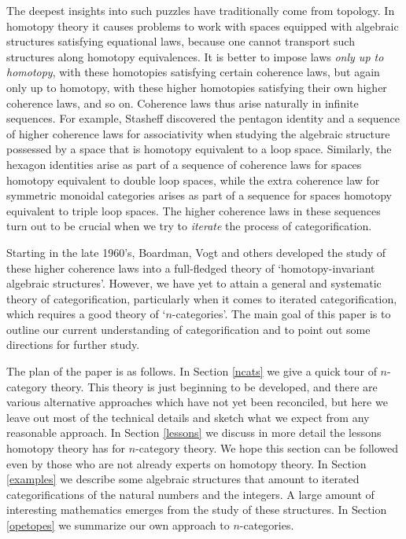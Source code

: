 The deepest insights into such puzzles have traditionally come from
topology.  In homotopy theory it causes problems to work with spaces
equipped with algebraic structures satisfying equational laws, because
one cannot transport such structures along homotopy equivalences.   It
is better to impose laws {\it only up to homotopy}, with these
homotopies satisfying certain coherence laws, but again only up to
homotopy, with these higher homotopies satisfying their own higher
coherence laws, and so on.  Coherence laws thus arise naturally in
infinite sequences.  For example, Stasheff \cite{Stasheff} discovered
the pentagon identity and a sequence of higher coherence laws for
associativity when studying the algebraic structure possessed by a space
that is homotopy equivalent to a loop space.  Similarly, the hexagon
identities arise as part of a sequence of coherence laws for spaces
homotopy equivalent to double loop spaces, while the extra coherence law
for symmetric monoidal categories arises as part of a sequence for
spaces homotopy equivalent to triple loop spaces.   The higher coherence
laws in these sequences turn out to be crucial when we try to {\it
iterate} the process of categorification.  

Starting in the late 1960's, Boardman, Vogt \cite{BV,BV2} and others
developed the study of these higher coherence laws into a full-fledged
theory of `homotopy-invariant algebraic structures'.   However, we have
yet to attain a general and systematic  theory of categorification,
particularly when it comes to iterated categorification, which requires
a good theory of `$n$-categories'.  The main goal of this paper is to
outline our current understanding of categorification and to point out
some directions for further study.  

The plan of the paper is as follows.  In Section \ref{ncats} we give a
quick tour of $n$-category theory.  This theory is just beginning to be
developed, and there are various alternative approaches which have not
yet been reconciled, but here we leave out most of the technical details
and sketch what we expect from any reasonable approach.  In Section
\ref{lessons} we discuss in more detail the lessons homotopy theory has
for $n$-category theory.  We hope this section can be followed even 
by those who are not already experts on homotopy theory.   
In Section \ref{examples} we describe some algebraic structures that 
amount to iterated categorifications of the natural numbers and the integers.  
A large amount of interesting mathematics emerges from the study of these
structures.  In Section \ref{opetopes} we summarize our own approach to
$n$-categories.  


